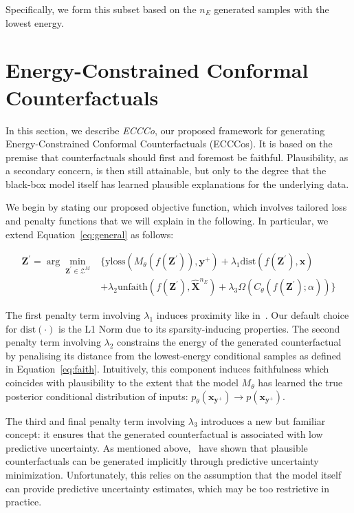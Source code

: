 \documentclass{article}
\begin{document}
Specifically, we form this subset based on the $n_E$ generated samples with the lowest energy. 

\section{Energy-Constrained Conformal Counterfactuals}\label{meth}

In this section, we describe \textit{ECCCo}, our proposed framework for generating Energy-Constrained Conformal Counterfactuals (ECCCos). It is based on the premise that counterfactuals should first and foremost be faithful. Plausibility, as a secondary concern, is then still attainable, but only to the degree that the black-box model itself has learned plausible explanations for the underlying data. 

We begin by stating our proposed objective function, which involves tailored loss and penalty functions that we will explain in the following. In particular, we extend Equation~\ref{eq:general} as follows:

\begin{equation} \label{eq:eccco}
  \begin{aligned}
  \mathbf{Z}^\prime= \arg \min_{\mathbf{Z}^\prime \in \mathcal{Z}^M}  &\{  {\text{yloss}(M_{\theta}(f(\mathbf{Z}^\prime)),\mathbf{y}^+)}+ \lambda_{1} {\text{dist}(f(\mathbf{Z}^\prime),\mathbf{x}) } \\
  &+ \lambda_2 \text{unfaith}(f(\mathbf{Z}^\prime),\hat{\mathbf{X}}^{n_E}) + \lambda_3 \Omega(C_{\theta}(f(\mathbf{Z}^\prime);\alpha)) \} 
  \end{aligned} 
\end{equation}

The first penalty term involving $\lambda_1$ induces proximity like in~\citet{wachter2017counterfactual}. Our default choice for $\text{dist}(\cdot)$ is the L1 Norm due to its sparsity-inducing properties. The second penalty term involving $\lambda_2$ constrains the energy of the generated counterfactual by penalising its distance from the lowest-energy conditional samples as defined in Equation~\ref{eq:faith}. Intuitively, this component induces faithfulness which coincides with plausibility to the extent that the model $M_{\theta}$ has learned the true posterior conditional distribution of inputs: $p_{\theta}(\mathbf{x}_{\mathbf{y}^+}) \rightarrow p(\mathbf{x}_{\mathbf{y}^+})$. 

The third and final penalty term involving $\lambda_3$ introduces a new but familiar concept: it ensures that the generated counterfactual is associated with low predictive uncertainty. As mentioned above,~\citet{schut2021generating} have shown that plausible counterfactuals can be generated implicitly through predictive uncertainty minimization. Unfortunately, this relies on the assumption that the model itself can provide predictive uncertainty estimates, which may be too restrictive in practice. 
\end{document}
